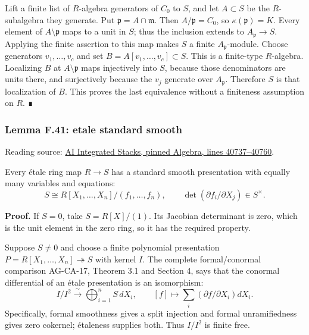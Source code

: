 \documentclass[11pt,a4paper,openany]{report}
\begin{document}
Lift a finite list of \(R\)-algebra generators of \(C_0\) to \(S\), and let \(A\subset S\) be the \(R\)-subalgebra they generate. Put \(\mathfrak p=A\cap\mathfrak m\). Then \(A/\mathfrak p=C_0\), so \(\kappa(\mathfrak p)=K\). Every element of \(A\setminus\mathfrak p\) maps to a unit in \(S\); thus the inclusion extends to \(A_{\mathfrak p}\to S\). Applying the finite assertion to this map makes \(S\) a finite \(A_{\mathfrak p}\)-module. Choose generators \(v_1,\ldots,v_c\) and set \(B=A[v_1,\ldots,v_c]\subset S\). This is a finite-type \(R\)-algebra. Localizing \(B\) at \(A\setminus\mathfrak p\) maps injectively into \(S\), because those denominators are units there, and surjectively because the \(v_j\) generate over \(A_{\mathfrak p}\). Therefore \(S\) is that localization of \(B\). This proves the last equivalence without a finiteness assumption on \(R\). ∎

\label{AG-RG-S05-algebra-lemma-etale-standard-smooth}

\subsubsection{Lemma F.41: etale standard smooth}\label{AG-RG-S05-lemma-f.41-etale-standard-smooth}

Reading source: \href{https://github.com/KokunoYumeto/unofficial-stacks-project-ai-drafts/blob/565b10e987aba5969b21145a0833f42d69f96790/algebra.tex\#L40737-L40760}{AI Integrated Stacks, pinned Algebra, lines 40737--40760}.

Every étale ring map \(R\to S\) has a standard smooth presentation with equally many variables and equations: \[S\cong R[X_1,\ldots,X_n]/(f_1,\ldots,f_n),\qquad
\det(\partial f_i/\partial X_j)\in S^\times.\]

\textbf{Proof.} If \(S=0\), take \(S=R[X]/(1)\). Its Jacobian determinant is zero, which is the unit element in the zero ring, so it has the required property.

Suppose \(S\ne0\) and choose a finite polynomial presentation \(P=R[X_1,\ldots,X_n]\twoheadrightarrow S\) with kernel \(I\). The complete formal/conormal comparison AG-CA-17, Theorem 3.1 and Section 4, says that the conormal differential of an étale presentation is an isomorphism: \[I/I^2\xrightarrow{\ \sim\ }\bigoplus_{i=1}^nS\,dX_i,\qquad
[f]\longmapsto\sum_i(\partial f/\partial X_i)dX_i.\] Specifically, formal smoothness gives a split injection and formal unramifiedness gives zero cokernel; étaleness supplies both. Thus \(I/I^2\) is finite free.
\end{document}
